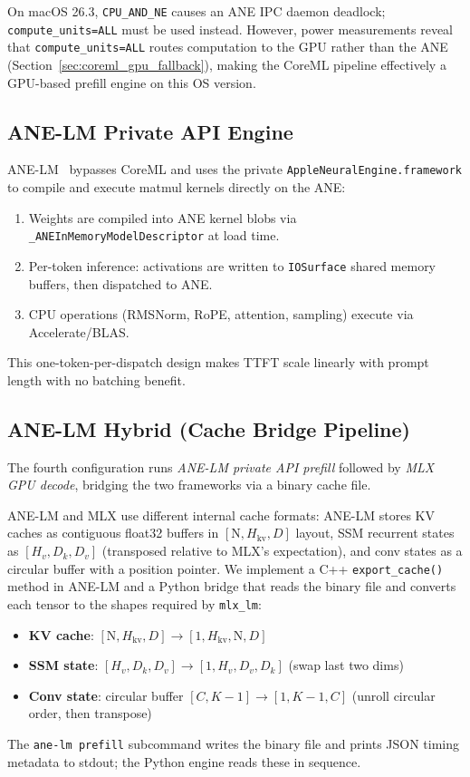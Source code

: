 \documentclass[11pt]{article}
\begin{document}
On macOS 26.3, \texttt{CPU\_AND\_NE} causes an ANE IPC daemon deadlock;
\texttt{compute\_units=ALL} must be used instead.
However, power measurements reveal that \texttt{compute\_units=ALL}
routes computation to the GPU rather than the ANE
(Section~\ref{sec:coreml_gpu_fallback}), making the CoreML pipeline
effectively a GPU-based prefill engine on this OS version.

\subsection{ANE-LM Private API Engine}

ANE-LM~\cite{anelm} bypasses CoreML and uses the private
\texttt{AppleNeuralEngine.framework} to compile and execute matmul kernels
directly on the ANE:
\begin{enumerate}[topsep=2pt,itemsep=1pt]
  \item Weights are compiled into ANE kernel blobs via
    \texttt{\_ANEInMemoryModelDescriptor} at load time.
  \item Per-token inference: activations are written to
    \texttt{IOSurface} shared memory buffers, then dispatched to ANE.
  \item CPU operations (RMSNorm, RoPE, attention, sampling) execute via
    Accelerate/BLAS.
\end{enumerate}

This one-token-per-dispatch design makes TTFT scale linearly with prompt
length with no batching benefit.

\subsection{ANE-LM Hybrid (Cache Bridge Pipeline)}

The fourth configuration runs \textit{ANE-LM private API prefill} followed
by \textit{MLX GPU decode}, bridging the two frameworks via a binary cache file.

ANE-LM and MLX use different internal cache formats:
ANE-LM stores KV caches as contiguous float32 buffers in
$[\text{N}, H_{\text{kv}}, D]$ layout, SSM recurrent states as
$[H_v, D_k, D_v]$ (transposed relative to MLX's expectation), and conv
states as a circular buffer with a position pointer.
We implement a C++ \texttt{export\_cache()} method in ANE-LM and a Python
bridge that reads the binary file and converts each tensor to the shapes
required by \texttt{mlx\_lm}:
\begin{itemize}[topsep=2pt,itemsep=1pt]
  \item \textbf{KV cache}: $[\text{N}, H_{\text{kv}}, D] \to [1, H_{\text{kv}}, \text{N}, D]$
  \item \textbf{SSM state}: $[H_v, D_k, D_v] \to [1, H_v, D_v, D_k]$
    (swap last two dims)
  \item \textbf{Conv state}: circular buffer $[C, K{-}1] \to [1, K{-}1, C]$
    (unroll circular order, then transpose)
\end{itemize}
The \texttt{ane-lm prefill} subcommand writes the binary file and prints
JSON timing metadata to stdout; the Python engine reads these in sequence.
\end{document}
